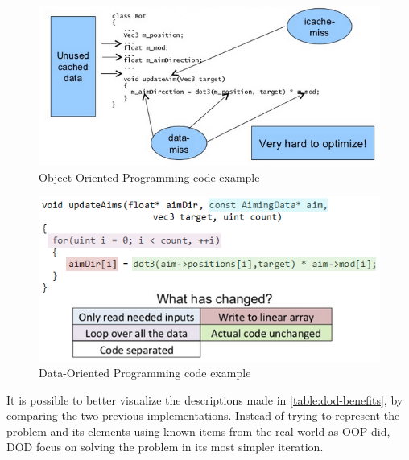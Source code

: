     \begin{figure}[H]
        \caption{
        \label{fig:dice_exampleOOP}
            Object-Oriented Programming code example
        }
        \begin{center}
        \includegraphics[scale=0.9]{images/dice-exampleOOP_Introduction-to-Data-Oriented-Design.png}
        \end{center}
    \end{figure}
    
    \begin{figure}[H]
        \caption{
        \label{fig:dice_exampleDOP}
            Data-Oriented Programming code example
        }
        \begin{center}
        \includegraphics[scale=1]{images/dice-exampleDOP_Introduction-to-Data-Oriented-Design.png}
        \end{center}
    \end{figure}
    
    It is possible to better visualize the descriptions made in \autoref{table:dod-benefits}, by comparing the two previous implementations. Instead of trying to represent the problem and its elements using known items from the real world as OOP did, DOD focus on solving the problem in its most simpler iteration.
    
